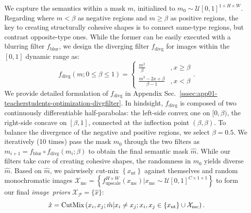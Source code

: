 \begin{foldable} %
    We capture the semantics within a mask $m$, initialized to $m_{0}\sim\mathcal{U}\left[0,1\right]^{1\times H\times W}$.
    Regarding where $m<\beta$ as negative regions and $m\ge\beta$ as positive regions, the key to creating structurally cohesive shapes is to connect same-type regions, but contrast opposite-type ones.
    While the former can be easily executed with a blurring filter $f_{\text{blur}}$, we design the diverging filter $f_{\text{divg}}$ for images within the $\left[0,1\right]$ dynamic range as:
    \begin{equation} \label{eq:synthesis-diverging-filter}
        f_{\text{divg}}\left(m;0\le\beta\le1\right)=\begin{cases}
            \frac{m^{2}}{\beta}            & ,x\ge\beta \\
            \frac{m^{2}-2x+\beta}{\beta-1} & ,x<\beta
        \end{cases}.
    \end{equation}
    We provide detailed formulation of $f_{\text{divg}}$ in Appendix Sec.~\ref{sssec:app01-teacherstudents-optimization-divgfilter}. In hindsight, $f_{\text{divg}}$ is composed of two continuously differentiable half-parabolas: the left-side convex one on $[0,\beta)$, the right-side concave on $\left[\beta,1\right]$, connected at the inflection point $\left(\beta,\beta\right)$.
    To balance the divergence of the negative and positive regions, we select $\beta=0.5$.
    We iteratively (10 times) pass the mask $m_0$ through the two filters as $m_{i+1}=f_{\text{blur}} \circ f_{\text{divg}}\left(m_{i};\beta\right)$ to obtain the final semantic mask $\hat{m}$.
    While our filters take care of creating cohesive shapes, the randomness in $m_{0}$ yields diverse $\hat{m}$.
    Based on $\hat{m}$, we pairwisely cut-mix $\left\{ x_{\text{nt}}\right\}$ against themselves and random monochromatic images $\mathcal{X}_{\text{mc}}=\left\{f_{\text{upscale}}^{H\times W}\left(x_{\text{mc}}\right)|x_{\text{mc}}\sim\mathcal{U}\left[0,1\right]^{C\times1\times1}\right\}$ to form our final \textit{image~priors} $\mathcal{X}_\mathcal{P} = \{\hat{x}\}$:
    \begin{equation} \label{eq:synthesis-semcutmix}
        \hat{x}=\text{CutMix}\left(x_{i},x_{j};\hat{m}|x_{i}\ne x_{j}; x_{i},x_{j}\in\left\{ x_{\text{nt}}\right\} \cup\mathcal{X}_{\text{\text{mc}}}\right).
    \end{equation}
\end{foldable}

